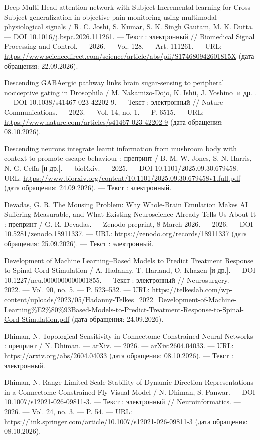 \begin{list}{}{\setlength{\leftmargin}{10mm}\setlength{\labelwidth}{8mm}\setlength{\labelsep}{2mm}\setlength{\itemsep}{0pt}\setlength{\parsep}{0pt}\setlength{\topsep}{0pt}}
\item[83.] Deep Multi-Head attention network with Subject-Incremental learning for Cross-Subject generalization in objective pain monitoring using multimodal physiological signals / R. C. Joshi, S. Kumar, S. K. Singh Gautam, M. K. Dutta. — DOI 10.1016/j.bspc.2026.111261. — Текст : электронный // Biomedical Signal Processing and Control. — 2026. — Vol. 128. — Art. 111261. — URL: \url{https://www.sciencedirect.com/science/article/abs/pii/S174680942601815X} (дата обращения: 22.09.2026).
\item[84.] Descending GABAergic pathway links brain sugar-sensing to peripheral nociceptive gating in Drosophila / M. Nakamizo-Dojo, K. Ishii, J. Yoshino [и др.]. — DOI 10.1038/s41467-023-42202-9. — Текст : электронный // Nature Communications. — 2023. — Vol. 14, no. 1. — P. 6515. — URL: \url{https://www.nature.com/articles/s41467-023-42202-9} (дата обращения: 08.10.2026).
\item[85.] Descending neurons integrate learnt information from mushroom body with context to promote escape behaviour : препринт / B. M. W. Jones, S. N. Harris, N. G. Ceffa [и др.]. — bioRxiv. — 2025. — DOI 10.1101/2025.09.30.679458. — URL: \url{https://www.biorxiv.org/content/10.1101/2025.09.30.679458v1.full.pdf} (дата обращения: 24.09.2026). — Текст : электронный.
\item[86.] Devadas, G. R. The Mousing Problem: Why Whole-Brain Emulation Makes AI Suffering Measurable, and What Existing Neuroscience Already Tells Us About It : препринт / G. R. Devadas. — Zenodo preprint, 8 March 2026. — 2026. — DOI 10.5281/zenodo.18911337. — URL: \url{https://zenodo.org/records/18911337} (дата обращения: 25.09.2026). — Текст : электронный.
\item[87.] Development of Machine Learning–Based Models to Predict Treatment Response to Spinal Cord Stimulation / A. Hadanny, T. Harland, O. Khazen [и др.]. — DOI 10.1227/neu.0000000000001855. — Текст : электронный // Neurosurgery. — 2022. — Vol. 90, no. 5. — P. 523–532. — URL: \url{https://telkeslab.com/wp-content/uploads/2023/05/Hadanny-Telkes\_2022\_Development-of-Machine-Learning\%E2\%80\%93Based-Models-to-Predict-Treatment-Response-to-Spinal-Cord-Stimulation.pdf} (дата обращения: 24.09.2026).
\item[88.] Dhiman, N. Topological Sensitivity in Connectome-Constrained Neural Networks : препринт / N. Dhiman. — arXiv. — 2026. — arXiv:2604.04033. — URL: \url{https://arxiv.org/abs/2604.04033} (дата обращения: 08.10.2026). — Текст : электронный.
\item[89.] Dhiman, N. Range-Limited Scale Stability of Dynamic Direction Representations in a Connectome-Constrained Fly Visual Model / N. Dhiman, S. Panwar. — DOI 10.1007/s12021-026-09811-3. — Текст : электронный // Neuroinformatics. — 2026. — Vol. 24, no. 3. — P. 54. — URL: \url{https://link.springer.com/article/10.1007/s12021-026-09811-3} (дата обращения: 08.10.2026).

\end{list}
